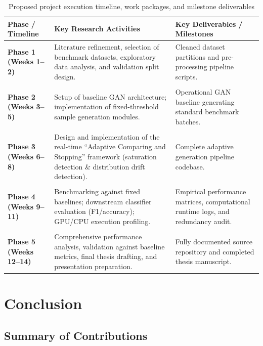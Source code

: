 \documentclass[12pt,a4paper]{report}
\begin{document}
\begin{justify}
\begin{table}[H]
\centering
\caption{Proposed project execution timeline, work packages, and milestone deliverables}
\label{tab:timeline}
\fontsize{9.5pt}{12pt}\selectfont
\begin{tabular}{@{} l p{7.2cm} p{5.3cm} @{}}
\toprule
\textbf{Phase / Timeline} & \textbf{Key Research Activities} & \textbf{Key Deliverables / Milestones} \\
\midrule
\textbf{Phase 1 (Weeks 1--2)} & Literature refinement, selection of benchmark datasets, exploratory data analysis, and validation split design. & Cleaned dataset partitions and pre-processing pipeline scripts. \\ \\
\addlinespace
\textbf{Phase 2 (Weeks 3--5)} & Setup of baseline GAN architecture; implementation of fixed-threshold sample generation modules. & Operational GAN baseline generating standard benchmark batches. \\ \\
\addlinespace
\textbf{Phase 3 (Weeks 6--8)} & Design and implementation of the real-time ``Adaptive Comparing and Stopping'' framework (saturation detection \& distribution drift detection). & Complete adaptive generation pipeline codebase. \\ \\
\addlinespace
\textbf{Phase 4 (Weeks 9--11)} & Benchmarking against fixed baselines; downstream classifier evaluation (F1/accuracy); GPU/CPU execution profiling. & Empirical performance matrices, computational runtime logs, and redundancy audit. \\ \\
\addlinespace
\textbf{Phase 5 (Weeks 12--14)} & Comprehensive performance analysis, validation against baseline metrics, final thesis drafting, and presentation preparation. & Fully documented source repository and completed thesis manuscript. \\
\bottomrule
\end{tabular}
\end{table}


\chapter{Conclusion}

\section{Summary of Contributions}


\end{justify}
\end{document}
